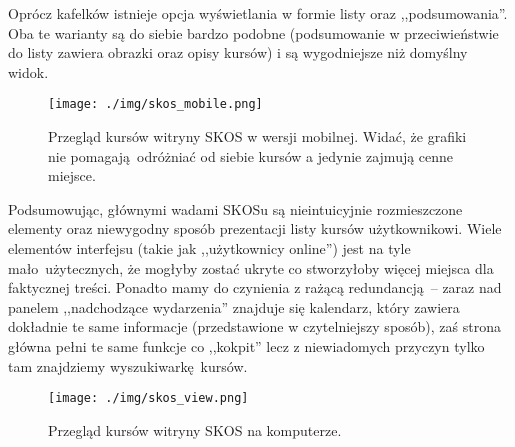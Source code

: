 \documentclass[12pt, a4paper, oneside]{report}
\begin{document}
Oprócz kafelków istnieje opcja wyświetlania w formie listy oraz 
,,podsumowania''. Oba te warianty są do siebie bardzo podobne (podsumowanie
w przeciwieństwie do listy zawiera obrazki oraz opisy kursów) i są wygodniejsze
niż domyślny widok.\\

\begin{figure}[H]
    \centering
    \texttt{[image: ./img/skos\_mobile.png]}
    \caption{Przegląd kursów witryny SKOS w wersji mobilnej. Widać, że grafiki
             nie pomagają odróżniać od siebie kursów a jedynie zajmują cenne
             miejsce.}
    \label{figure:skos-mobile}
\end{figure}


Podsumowując, głównymi wadami SKOSu są nieintuicyjnie rozmieszczone elementy
oraz niewygodny sposób prezentacji listy kursów użytkownikowi. Wiele elementów
interfejsu (takie jak ,,użytkownicy online'') jest na tyle mało użytecznych, że
mogłyby zostać ukryte co stworzyłoby więcej miejsca dla faktycznej treści.
Ponadto mamy do czynienia z rażącą redundancją -- zaraz nad panelem 
,,nadchodzące wydarzenia'' znajduje się kalendarz, który zawiera dokładnie
te same informacje (przedstawione w czytelniejszy sposób), zaś strona główna
pełni te same funkcje co ,,kokpit'' lecz z niewiadomych przyczyn tylko tam 
znajdziemy wyszukiwarkę kursów.


\begin{figure}
    \centering
    \texttt{[image: ./img/skos\_view.png]}
    \caption{Przegląd kursów witryny SKOS na komputerze.}
    \label{figure:skos-mobile}
\end{figure}
\end{document}

